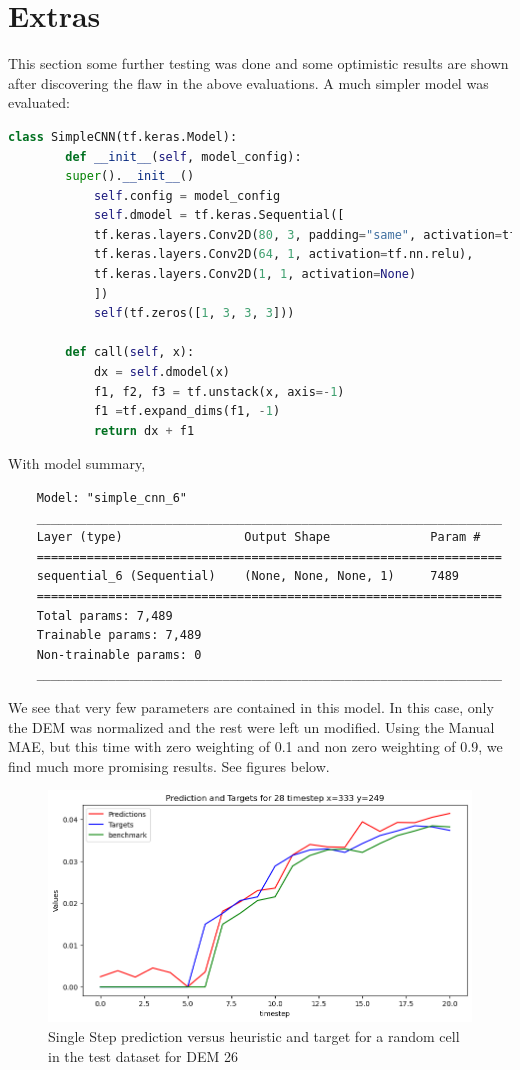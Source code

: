 \section{Extras}
\label{Extra}
This section some further testing was done and some optimistic results are shown after discovering the flaw in the above evaluations. A much simpler model was evaluated:

\begin{lstlisting}[language=Python]
	class SimpleCNN(tf.keras.Model):
		def __init__(self, model_config):
		super().__init__()
			self.config = model_config
			self.dmodel = tf.keras.Sequential([
			tf.keras.layers.Conv2D(80, 3, padding="same", activation=tf.nn.relu),
			tf.keras.layers.Conv2D(64, 1, activation=tf.nn.relu),
			tf.keras.layers.Conv2D(1, 1, activation=None)
			])
			self(tf.zeros([1, 3, 3, 3]))
		
		def call(self, x):
			dx = self.dmodel(x)
			f1, f2, f3 = tf.unstack(x, axis=-1)
			f1 =tf.expand_dims(f1, -1)
			return dx + f1
\end{lstlisting}
With model summary,

\begin{verbatim}
	Model: "simple_cnn_6"
	_________________________________________________________________
	Layer (type)                 Output Shape              Param #   
	=================================================================
	sequential_6 (Sequential)    (None, None, None, 1)     7489      
	=================================================================
	Total params: 7,489
	Trainable params: 7,489
	Non-trainable params: 0
	_________________________________________________________________
\end{verbatim}
We see that very few parameters are contained in this model. In this case, only the DEM was normalized and the rest were left un modified. Using the Manual MAE, but this time with zero weighting of 0.1 and non zero weighting of 0.9, we find much more promising results. See figures below.

\begin{figure}[tbph]
	\centering
	\includegraphics[width=0.8\linewidth, height=0.3\textheight]{Figures/Results/extra/extra_single_step}
	\caption[Extra Single Step prediction]{Single Step prediction versus heuristic and target for a random cell in the test dataset for DEM 26}
	\label{fig:extrasinglestep}
\end{figure}


